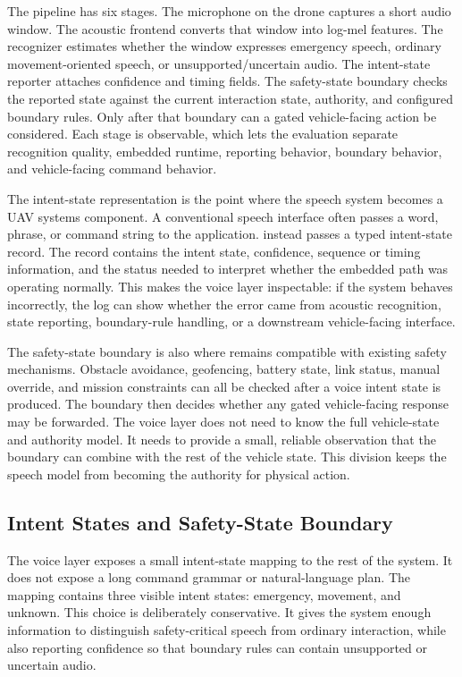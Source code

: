 The pipeline has six stages. The microphone on the drone captures a short audio window. The acoustic frontend converts that window into log-mel features. The recognizer estimates whether the window expresses emergency speech, ordinary movement-oriented speech, or unsupported/uncertain audio. The intent-state reporter attaches confidence and timing fields. The safety-state boundary checks the reported state against the current interaction state, authority, and configured boundary rules. Only after that boundary can a gated vehicle-facing action be considered. Each stage is observable, which lets the evaluation separate recognition quality, embedded runtime, reporting behavior, boundary behavior, and vehicle-facing command behavior.

The intent-state representation is the point where the speech system becomes a UAV systems component. A conventional speech interface often passes a word, phrase, or command string to the application. \sys{} instead passes a typed intent-state record. The record contains the intent state, confidence, sequence or timing information, and the status needed to interpret whether the embedded path was operating normally. This makes the voice layer inspectable: if the system behaves incorrectly, the log can show whether the error came from acoustic recognition, state reporting, boundary-rule handling, or a downstream vehicle-facing interface.

The safety-state boundary is also where \sys{} remains compatible with existing safety mechanisms. Obstacle avoidance, geofencing, battery state, link status, manual override, and mission constraints can all be checked after a voice intent state is produced. The boundary then decides whether any gated vehicle-facing response may be forwarded. The voice layer does not need to know the full vehicle-state and authority model. It needs to provide a small, reliable observation that the boundary can combine with the rest of the vehicle state. This division keeps the speech model from becoming the authority for physical action.

\subsection{Intent States and Safety-State Boundary}

The voice layer exposes a small intent-state mapping to the rest of the system. It does not expose a long command grammar or natural-language plan. The mapping contains three visible intent states: emergency, movement, and unknown. This choice is deliberately conservative. It gives the system enough information to distinguish safety-critical speech from ordinary interaction, while also reporting confidence so that boundary rules can contain unsupported or uncertain audio.


